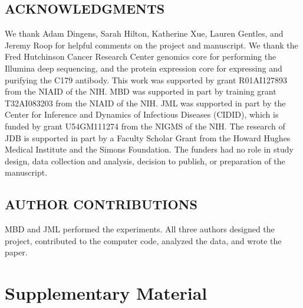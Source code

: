 \documentclass[11pt]{article}
\begin{document}
\subsection*{ACKNOWLEDGMENTS}
We thank Adam Dingens, Sarah Hilton, Katherine Xue, Lauren Gentles, and Jeremy Roop for helpful comments on the project and manuscript.
We thank the Fred Hutchinson Cancer Research Center genomics core for performing the Illumina deep sequencing, and the protein expression core for expressing and purifying the C179 antibody.
This work was supported by grant R01AI127893 from the NIAID of the NIH.
MBD was supported in part by training grant T32AI083203 from the NIAID of the NIH.
JML was supported in part by the Center for Inference and Dynamics of Infectious Diseases (CIDID), which is funded by grant U54GM111274 from the NIGMS of the NIH.
The research of JDB is supported in part by a Faculty Scholar Grant from the Howard Hughes Medical Institute and the Simons Foundation.
The funders had no role in study design, data collection and analysis, decision to publish, or preparation of the manuscript.

\subsection*{AUTHOR CONTRIBUTIONS}
MBD and JML performed the experiments.
All three authors designed the project, contributed to the computer code, analyzed the data, and wrote the paper.




\clearpage
\normalsize

\section*{Supplementary Material}
\FloatBarrier
{}%
\renewcommand*{\thepage}{S\arabic{page}}
\end{document}
